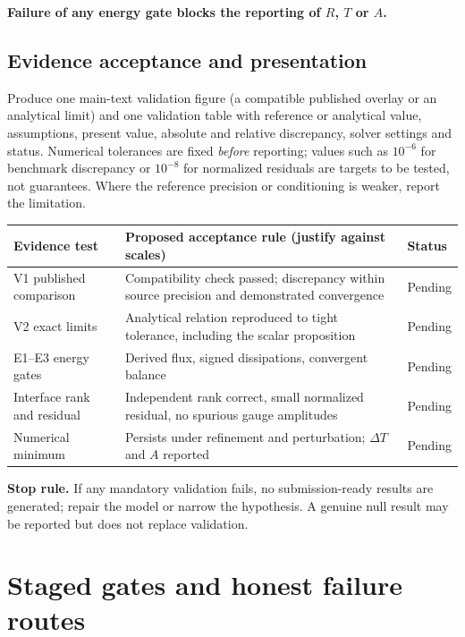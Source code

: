 \documentclass[11pt]{article}
\begin{document}
\textbf{Failure of any energy gate blocks the reporting of $R$, $T$ or $A$.}

\subsection{Evidence acceptance and presentation}

Produce one main-text validation figure (a compatible published overlay or an
analytical limit) and one validation table with reference or analytical value,
assumptions, present value, absolute and relative discrepancy, solver settings and
status. Numerical tolerances are fixed \emph{before} reporting; values such as
$10^{-6}$ for benchmark discrepancy or $10^{-8}$ for normalized residuals are
targets to be tested, not guarantees. Where the reference precision or conditioning
is weaker, report the limitation.

\begin{center}
\begin{tabular}{@{}p{}p{}p{}@{}}
\toprule
\textbf{Evidence test} & \textbf{Proposed acceptance rule (justify against
scales)} & \textbf{Status} \\
\midrule
V1 published comparison & Compatibility check passed; discrepancy within source
  precision and demonstrated convergence & Pending \\
V2 exact limits & Analytical relation reproduced to tight tolerance, including
  the scalar proposition & Pending \\
E1--E3 energy gates & Derived flux, signed dissipations, convergent balance &
  Pending \\
Interface rank and residual & Independent rank correct, small normalized
  residual, no spurious gauge amplitudes & Pending \\
Numerical minimum & Persists under refinement and perturbation; $\Delta T$ and
  $A$ reported & Pending \\
\bottomrule
\end{tabular}
\end{center}

\textbf{Stop rule.} If any mandatory validation fails, no submission-ready results
are generated; repair the model or narrow the hypothesis. A genuine null result
may be reported but does not replace validation.

\section{Staged gates and honest failure routes}
\end{document}
